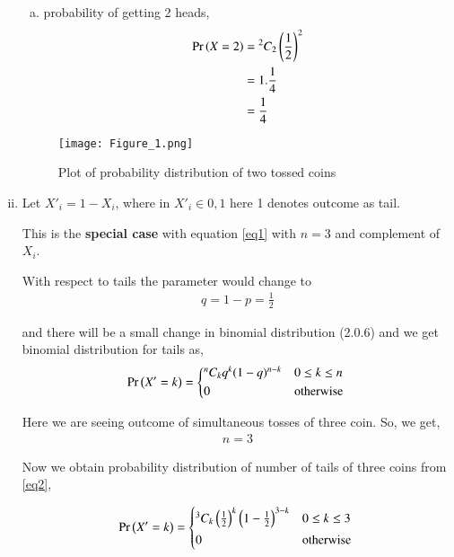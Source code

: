 \documentclass[journal,12pt,twocolumn]{IEEEtran}
\begin{document}
\begin{enumerate}[(i)]
\begin{enumerate}[(a)]
    \item probability of getting 2 heads,
        \begin{align}
            \begin{split}
                \Pr\left(X=2\right) &= {^2C_2}\left(\frac{1}{2}\right)^2\\
                &=1.\frac{1}{4}\\
                &=\frac{1}{4}
            \end{split}
        \end{align}
\end{enumerate}

\begin{figure}[h!]
    \centering
    \texttt{[image: Figure\_1.png]}
    \caption{Plot of probability distribution of two tossed coins}
    \label{fig:Two coins}
\end{figure}

\item

Let $X'_i=1-X_i$, where in $X'_i \in {0,1}$ here 1 denotes outcome as tail.

This is the \textbf{special case} with equation \eqref{eq1} with $n=3$ and complement of $X_i$.

With respect to tails the parameter would change to 
\begin{align}
    q=1-p=\frac{1}{2}
\end{align}

and there will be a small change in binomial distribution (2.0.6) and we get binomial distribution for tails as,
\begin{align}\label{eq2}
   \pr{X'=k} =
  \begin{cases*}
    {^n C_k}q^{k}(1-q)^{n-k} & $0 \leq k \leq n$\\
      0 & otherwise
  \end{cases*}
\end{align}

Here we are seeing outcome of simultaneous tosses of three coin. So, we get,
\begin{align}
    n=3
\end{align}

Now we obtain probability distribution of number of tails of three coins from \eqref{eq2},

\begin{align*}
   \pr{X'=k} =
  \begin{cases*}
    {^3 C_k}\brak{\frac{1}{2}}^{k}\brak{1-\frac{1}{2}}^{3-k} & $0 \leq k \leq 3$\\
    0 & otherwise
  \end{cases*}
\end{align*}


\end{enumerate}
\end{document}
